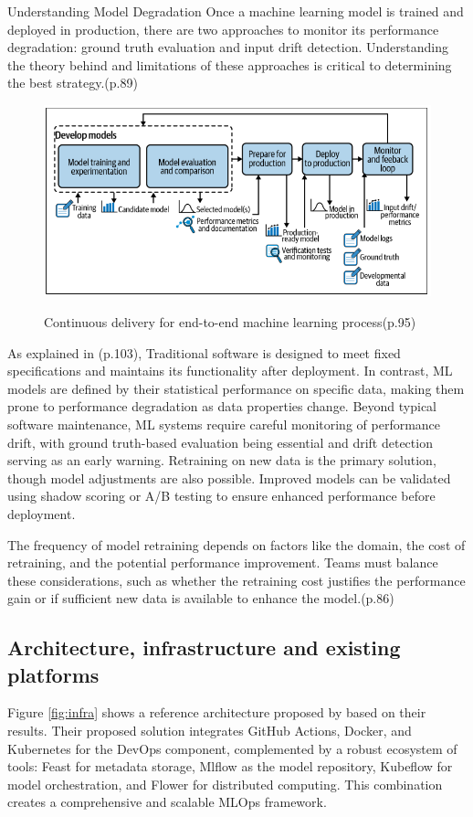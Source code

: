 Understanding Model Degradation
Once a machine learning model is trained and deployed in production, there are two
approaches to monitor its performance degradation: ground truth evaluation and
input drift detection. Understanding the theory behind and limitations of these
approaches is critical to determining the best strategy.\cite{treveil2020introducing}(p.89)

\begin{figure}[!htbp]
    \caption{Continuous delivery for end-to-end machine learning process\cite{treveil2020introducing}(p.95)}
    \centering
    \includegraphics[scale=0.5]{images/feedback-loop-intro}
    \label{fig:feedback-loop-intro}
\end{figure}


As explained in \cite{treveil2020introducing}(p.103), Traditional software is designed to meet fixed specifications and maintains its functionality after deployment.
In contrast, ML models are defined by their statistical performance on specific data, making them prone to performance degradation as data properties change.
Beyond typical software maintenance, ML systems require careful monitoring of performance drift,
with ground truth-based evaluation being essential and drift detection serving as an early warning.
Retraining on new data is the primary solution, though model adjustments are also possible.
Improved models can be validated using shadow scoring or A/B testing to ensure enhanced performance before deployment.

The frequency of model retraining depends on factors like the domain, the cost of retraining, and the potential performance improvement.
Teams must balance these considerations, such as whether the retraining cost justifies the performance gain or if sufficient new data is available to enhance the model.\cite{treveil2020introducing}(p.86)

\subsection{Architecture, infrastructure and existing platforms}\label{subsec:architecture-infrastructure-and-existing-platforms}
Figure \ref{fig:infra} shows a reference architecture proposed by\cite{10855428} based on their results.
Their proposed solution integrates GitHub Actions, Docker, and Kubernetes for the DevOps component, complemented by a robust ecosystem of tools:
Feast for metadata storage, Mlflow as the model repository, Kubeflow for model orchestration, and Flower for distributed computing.
This combination creates a comprehensive and scalable MLOps framework.

